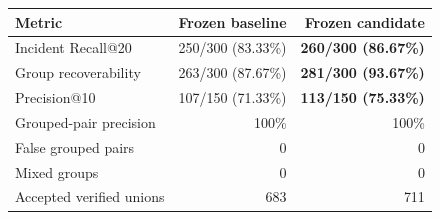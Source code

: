\begin{tabularx}{0.88\textwidth}{Xrr}
\toprule
Metric & Frozen baseline & Frozen candidate \\
\midrule
Incident Recall@20 & 250/300 (83.33\%) & \textbf{260/300 (86.67\%)} \\
Group recoverability & 263/300 (87.67\%) & \textbf{281/300 (93.67\%)} \\
Precision@10 & 107/150 (71.33\%) & \textbf{113/150 (75.33\%)} \\
Grouped-pair precision & 100\% & 100\% \\
False grouped pairs & 0 & 0 \\
Mixed groups & 0 & 0 \\
Accepted verified unions & 683 & 711 \\
\bottomrule
\end{tabularx}
